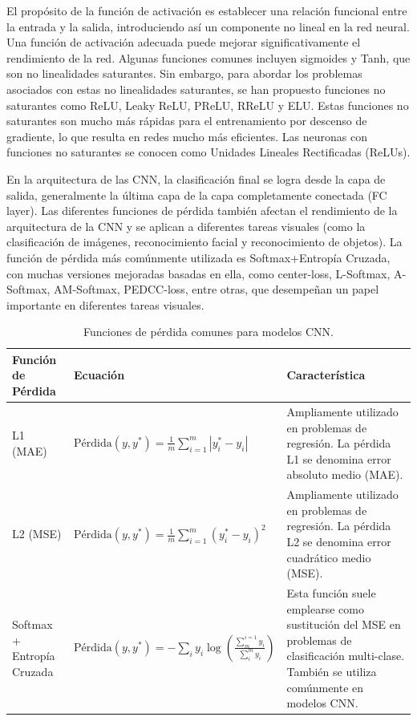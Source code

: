  El propósito de la función de activación es establecer una relación funcional entre la entrada y la salida, introduciendo así un componente no lineal en la red neural. Una función de activación adecuada puede mejorar significativamente el rendimiento de la red. Algunas funciones comunes incluyen sigmoides y Tanh, que son no linealidades saturantes. Sin embargo, para abordar los problemas asociados con estas no linealidades saturantes, se han propuesto funciones no saturantes como ReLU, Leaky ReLU, PReLU, RReLU y ELU. Estas funciones no saturantes son mucho más rápidas para el entrenamiento por descenso de gradiente, lo que resulta en redes mucho más eficientes. Las neuronas con funciones no saturantes se conocen como Unidades Lineales Rectificadas (ReLUs).
 
 En la arquitectura de las CNN, la clasificación final se logra desde la capa de salida, generalmente la última capa de la capa completamente conectada (FC layer). Las diferentes funciones de pérdida también afectan el rendimiento de la arquitectura de la CNN y se aplican a diferentes tareas visuales (como la clasificación de imágenes, reconocimiento facial y reconocimiento de objetos). La función de pérdida más comúnmente utilizada es Softmax+Entropía Cruzada, con muchas versiones mejoradas basadas en ella, como center-loss, L-Softmax, A-Softmax, AM-Softmax, PEDCC-loss, entre otras, que desempeñan un papel importante en diferentes tareas visuales.
 
\begin{table}[H]
	\centering
	\caption{Funciones de pérdida comunes para modelos CNN.}
	\label{tab:loss_functions}
	\begin{tabular}{p{3cm}p{5cm}p{7cm}}
		\toprule
		Función de Pérdida & Ecuación & Característica \\
		\bottomrule
		L1 (MAE) & $\text{Pérdida}(y, y^*) = \frac{1}{m} \sum_{i=1}^{m} |y^*_i - y_i|$ & Ampliamente utilizado en problemas de regresión. La pérdida L1 se denomina error absoluto medio (MAE). \\
		\midrule
		L2 (MSE) & $\text{Pérdida}(y, y^*) = \frac{1}{m} \sum_{i=1}^{m} (y^*_i - y_i)^2$ & Ampliamente utilizado en problemas de regresión. La pérdida L2 se denomina error cuadrático medio (MSE). \\
		\midrule
		Softmax + Entropía Cruzada & $\text{Pérdida}(y, y^*) = - \sum_{i} y_i \log\left(\frac{\sum_{m}^{i=1} y_i}{\sum_{i}^{m} y_i}\right)$ & Esta función suele emplearse como sustitución del MSE en problemas de clasificación multi-clase. También se utiliza comúnmente en modelos CNN. \\
		\midrule
	\end{tabular}
\end{table}


